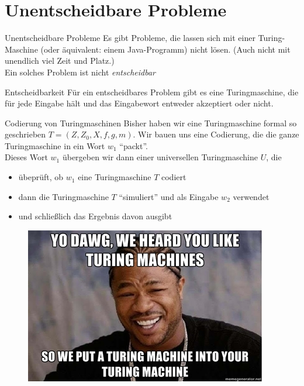 \section{Unentscheidbare Probleme}
\begin{frame}{Unentscheidbare Probleme}
    Es gibt Probleme, die lassen sich mit einer Turing-Maschine (oder äquivalent: einem Java-Programm) nicht lösen. (Auch nicht mit unendlich viel Zeit und Platz.)\\
    Ein solches Problem ist nicht \emph{entscheidbar}
    \begin{block}{Entscheidbarkeit}
        Für ein entscheidbares Problem gibt es eine Turingmaschine, die für jede Eingabe hält und das Eingabewort entweder akzeptiert oder nicht.
    \end{block}
\end{frame}
\begin{frame}{Codierung von Turingmaschinen}
   Bisher haben wir eine Turingmaschine formal so geschrieben $T = \left( Z, Z_0, X, f, g, m \right)$. Wir bauen uns eine Codierung, die die ganze Turingmaschine in ein Wort $w_1$ ``packt''. \\
   Dieses Wort $w_1$ übergeben wir dann einer universellen Turingmaschine $U$, die 
   \begin{itemize}
       \item übeprüft, ob $w_1$ eine Turingmaschine $T$ codiert
       \item dann die Turingmaschine $T$ ``simuliert'' und als Eingabe $w_2$ verwendet
       \item und schließlich das Ergebnis davon ausgibt
   \end{itemize}
   \begin{figure}[h]
       \centering
       \includegraphics[scale=.5]{graphics/13/33928220.jpg}
   \end{figure}
\end{frame}
